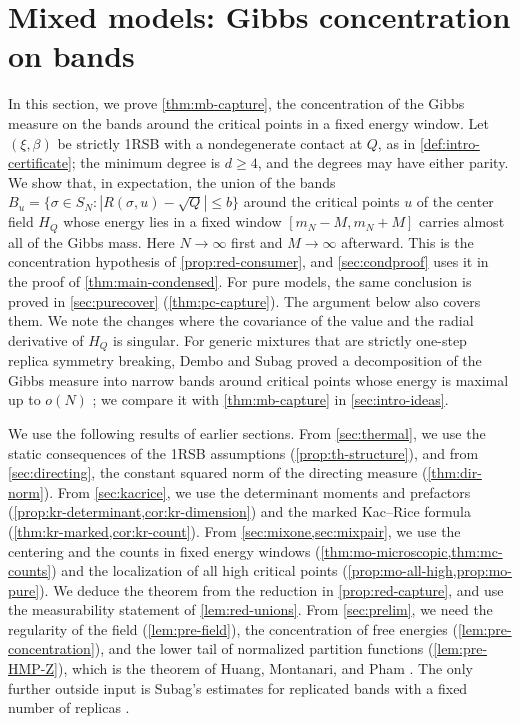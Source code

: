 \chapter{Mixed models: Gibbs concentration on bands}\label{sec:mixbands}

In this section, we prove \cref{thm:mb-capture}, the concentration of the Gibbs measure on the bands around the critical points in a fixed energy window. Let $(\xi,\beta)$ be strictly 1RSB with a nondegenerate contact at $Q$, as in \cref{def:intro-certificate}; the minimum degree is $d\ge4$, and the degrees may have either parity. We show that, in expectation, the union of the bands $B_u=\{\sigma\in S_N:|R(\sigma,u)-\sqrt Q|\le b\}$ around the critical points $u$ of the center field $H_Q$ whose energy lies in a fixed window $[m_N-M,m_N+M]$ carries almost all of the Gibbs mass. Here $N\to\infty$ first and $M\to\infty$ afterward. This is the concentration hypothesis of \cref{prop:red-consumer}, and \cref{sec:condproof} uses it in the proof of \cref{thm:main-condensed}. For pure models, the same conclusion is proved in \cref{sec:purecover} (\cref{thm:pc-capture}). The argument below also covers them. We note the changes where the covariance of the value and the radial derivative of $H_Q$ is singular. For generic mixtures that are strictly one-step replica symmetry breaking, Dembo and Subag proved a decomposition of the Gibbs measure into narrow bands around critical points whose energy is maximal up to $o(N)$ \cite[Proposition~3.1]{DemboSubag2026}; we compare it with \cref{thm:mb-capture} in \cref{sec:intro-ideas}.

We use the following results of earlier sections. From \cref{sec:thermal}, we use the static consequences of the 1RSB assumptions (\cref{prop:th-structure}), and from \cref{sec:directing}, the constant squared norm of the directing measure (\cref{thm:dir-norm}). From \cref{sec:kacrice}, we use the determinant moments and prefactors (\cref{prop:kr-determinant,cor:kr-dimension}) and the marked Kac--Rice formula (\cref{thm:kr-marked,cor:kr-count}). From \cref{sec:mixone,sec:mixpair}, we use the centering and the counts in fixed energy windows (\cref{thm:mo-microscopic,thm:mc-counts}) and the localization of all high critical points (\cref{prop:mo-all-high,prop:mo-pure}). We deduce the theorem from the reduction in \cref{prop:red-capture}, and use the measurability statement of \cref{lem:red-unions}. From \cref{sec:prelim}, we need the regularity of the field (\cref{lem:pre-field}), the concentration of free energies (\cref{lem:pre-concentration}), and the lower tail of normalized partition functions (\cref{lem:pre-HMP-Z}), which is the theorem of Huang, Montanari, and Pham \cite[Lemma~3.2 and Remark~3.3]{HuangMontanariPham2024}. The only further outside input is Subag's estimates for replicated bands with a fixed number of replicas \cite[Lemmas~17--19 and Proposition~24]{Subag2024}.


